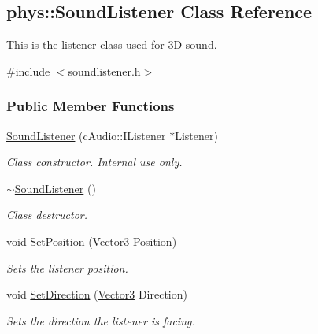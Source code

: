 \hypertarget{classphys_1_1SoundListener}{
\subsection{phys::SoundListener Class Reference}
\label{classphys_1_1SoundListener}
}


This is the listener class used for 3D sound.  




{\ttfamily \#include $<$soundlistener.h$>$}

\subsubsection*{Public Member Functions}
\begin{DoxyCompactItemize}
\item 
\hyperlink{classphys_1_1SoundListener_ab4063bdd8b0bc654a416915354ed0312}{SoundListener} (cAudio::IListener $\ast$Listener)
\begin{DoxyCompactList}\small\item\em Class constructor. Internal use only. \item\end{DoxyCompactList}\item 
\hyperlink{classphys_1_1SoundListener_ab32dd020228ca0e09271f988d3a2e7f9}{$\sim$SoundListener} ()
\begin{DoxyCompactList}\small\item\em Class destructor. \item\end{DoxyCompactList}\item 
void \hyperlink{classphys_1_1SoundListener_ab2a679aaf18c646365285c8691ffcb0c}{SetPosition} (\hyperlink{classphys_1_1Vector3}{Vector3} Position)
\begin{DoxyCompactList}\small\item\em Sets the listener position. \item\end{DoxyCompactList}\item 
void \hyperlink{classphys_1_1SoundListener_ad4ba93b650897e355c26b09e3f95bce0}{SetDirection} (\hyperlink{classphys_1_1Vector3}{Vector3} Direction)
\begin{DoxyCompactList}\small\item\em Sets the direction the listener is facing. \item\end{DoxyCompactList}\item 

\end{DoxyCompactItemize}
